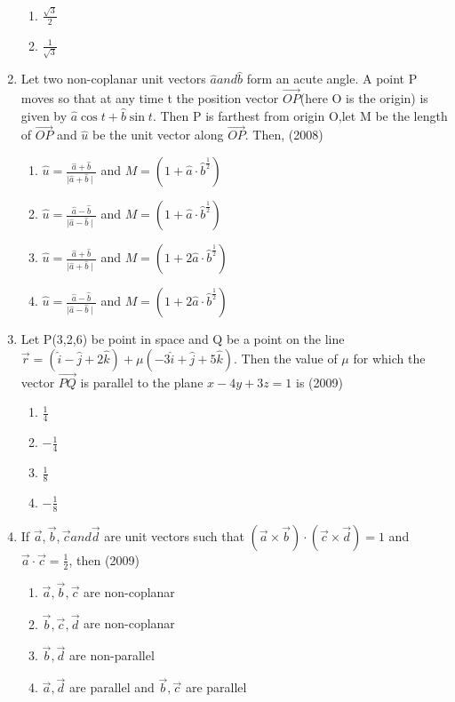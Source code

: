 \documentclass[12pt]{article}
\providecommand{\brak}[1]{\ensuremath{\left(#1\right)}}
\begin{document}
\begin{enumerate}
\begin{enumerate}
\item $\frac{\sqrt{3}}{2}$
\item $\frac{1}{\sqrt{3}}$
\end{enumerate}
\item Let two non-coplanar unit vectors $\hat{a} and \hat{b}$ form an acute  angle. A point P moves so that at any time t the position vector $\overrightarrow{OP}$(here O is the origin) is given by $\hat{a}\cos t+\hat{b}\sin t$. Then P is farthest from origin O,let M be the length of $\overrightarrow{OP}$ and $\hat{u}$ be the unit vector along $\overrightarrow{OP}$. Then, (2008)
\begin{enumerate}
\item $\hat{u}=\frac{\hat{a}+\hat{b}}{\mid\hat{a}+\hat{b}\mid}$ and $M=\brak{1+\hat{a}\cdot\hat{b}^\frac{1}{2}}$
\item $\hat{u}=\frac{\hat{a}-\hat{b}}{\mid\hat{a}-\hat{b}\mid}$ and $M=\brak{1+\hat{a}\cdot\hat{b}^\frac{1}{2}}$
\item $\hat{u}=\frac{\hat{a}+\hat{b}}{\mid\hat{a}+\hat{b}\mid}$ and $M=\brak{1+2\hat{a}\cdot\hat{b}^\frac{1}{2}}$
\item $\hat{u}=\frac{\hat{a}-\hat{b}}{\mid\hat{a}-\hat{b}\mid}$ and $M=\brak{1+2\hat{a}\cdot\hat{b}^\frac{1}{2}}$
\end{enumerate}
\item Let P(3,2,6) be point in space and Q be a point on the line $\vec{r}=\brak{\hat{i}-\hat{j}+2\hat{k}}+\mu\brak{-3\hat{i}+\hat{j}+5\hat{k}}$. Then the value of $\mu$ for which the vector $\overrightarrow{PQ}$ is parallel to the plane $x-4y+3z=1$  is (2009)
\begin{enumerate}
\item $\frac{1}{4}$
\item $-\frac{1}{4}$
\item $\frac{1}{8}$
\item $-\frac{1}{8}$
\end{enumerate}
\item If $\vec{a},\vec{b},\vec{c} and \vec{d}$ are unit vectors such that $\brak{\vec{a}\times\vec{b}}\cdot\brak{\vec{c}\times\vec{d}}=1$ and $\vec{a}\cdot\vec{c}=\frac{1}{2}$, then  (2009)
\begin{enumerate}
\item $\vec{a},\vec{b},\vec{c}$ are non-coplanar
\item $\vec{b},\vec{c},\vec{d}$ are non-coplanar
\item $\vec{b},\vec{d}$ are non-parallel
\item $\vec{a},\vec{d}$ are parallel and  $\vec{b},\vec{c}$ are parallel

\end{enumerate}
\end{enumerate}
\end{document}
